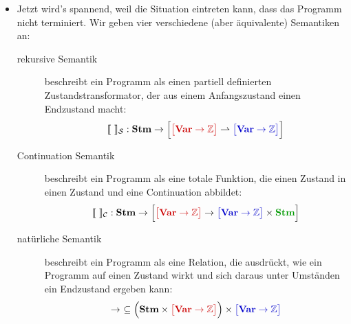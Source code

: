 \documentclass[
  a4paper,
  11pt,
]{scrartcl}
\newcommand{\Z}{\mathbb{Z}}
\newcommand{\Cc}{\mathcal{C}}
\newcommand{\Sc}{\mathcal{S}}
\begin{document}
\begin{itemize}
  \item Jetzt wird’s spannend, weil die Situation eintreten kann, dass das
    Programm nicht terminiert. Wir geben vier verschiedene (aber äquivalente)
    Semantiken an:
    \begin{description}
      \item[rekursive Semantik] beschreibt ein Programm als einen partiell
        definierten Zustandstransformator, der aus einem
        \textcolor{myred}{Anfangszustand} einen \textcolor{myblue}{Endzustand}
        macht:
        \begin{align*}
          \llbracket \ \rrbracket_{\Sc}:
          \textbf{Stm} \rightarrow
          \Big[
            \textcolor{myred}{\big[ \textbf{Var} \rightarrow \Z \big]}
            \rightharpoonup
            \textcolor{myblue}{\big[ \textbf{Var} \rightarrow \Z \big]}
          \Big]
        \end{align*}

      \item[Continuation Semantik] beschreibt ein Programm als eine totale
        Funktion, die einen \textcolor{myred}{Zustand} in einen
        \textcolor{myblue}{Zustand} und eine \textcolor{mygreen}{Continuation}
        abbildet:
        \begin{align*}
          \llbracket \ \rrbracket_{\Cc}:
          \textbf{Stm} \rightarrow
          \Big[
            \textcolor{myred}{\big[ \textbf{Var} \rightarrow \Z \big]}
            \rightarrow
            \textcolor{myblue}{\big[ \textbf{Var} \rightarrow \Z \big]}
            \times
            \textcolor{mygreen}{\textbf{Stm}}
          \Big]
        \end{align*}

      \item[natürliche Semantik] beschreibt ein Programm als eine Relation, die
        ausdrückt, wie ein Programm auf einen \textcolor{myred}{Zustand} wirkt
        und sich daraus unter Umständen ein \textcolor{myblue}{Endzustand}
        ergeben kann:
        \begin{align*}
          \rightarrow \ \subseteq
          \Big(
          \textbf{Stm}
          \times
          \textcolor{myred}{\big[ \textbf{Var} \rightarrow \Z \big]}
          \Big)
          \times
          \textcolor{myblue}{\big[ \textbf{Var} \rightarrow \Z \big]}
        \end{align*}


\end{description}
\end{itemize}
\end{document}
